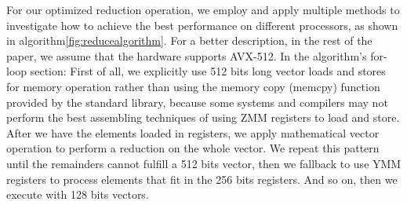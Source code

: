 \documentclass[5p,times,twocolumn]{elsarticle}
\begin{document}
%
For our optimized reduction operation, we employ and apply multiple
methods to investigate how to achieve the
best performance on different processors, as shown in algorithm\ref{fig:reducealgorithm}.
For a better description, in the rest of the paper, we assume that the hardware supports AVX-512.
In the algorithm's for-loop section: First of all, we explicitly use 512 bits long vector loads and stores for memory operation rather than using the memory copy (memcpy) function provided by
the standard library, because some systems and compilers may not perform
the best assembling techniques of using ZMM registers to load and store.
%
After we have the elements loaded in registers, we apply mathematical vector operation
to perform a reduction on the whole vector.
We repeat this pattern until the remainders cannot fulfill a 512 bits vector,
then we fallback to use YMM registers to process elements that fit in the 256 bits registers.
And so on, then we execute with 128 bits vectors.
\end{document}
